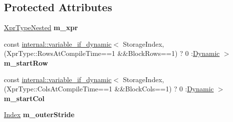 \subsection*{Protected Attributes}
\begin{DoxyCompactItemize}
\item 
\mbox{\label{class_eigen_1_1internal_1_1_block_impl__dense_3_01_xpr_type_00_01_block_rows_00_01_block_cols_00_01_inner_panel_00_01true_01_4_a746d7500a44f0475b2d11ffb0476135b}} 
\hyperlink{class_eigen_1_1internal_1_1_tensor_lazy_evaluator_writable}{Xpr\+Type\+Nested} {\bfseries m\+\_\+xpr}
\item 
\mbox{\label{class_eigen_1_1internal_1_1_block_impl__dense_3_01_xpr_type_00_01_block_rows_00_01_block_cols_00_01_inner_panel_00_01true_01_4_a1de08e356021d7186750589df6f58fca}} 
const \hyperlink{class_eigen_1_1internal_1_1variable__if__dynamic}{internal\+::variable\+\_\+if\+\_\+dynamic}$<$ Storage\+Index,(Xpr\+Type\+::\+Rows\+At\+Compile\+Time==1 \&\&Block\+Rows==1) ? 0 \+:\hyperlink{namespace_eigen_ad81fa7195215a0ce30017dfac309f0b2}{Dynamic} $>$ {\bfseries m\+\_\+start\+Row}
\item 
\mbox{\label{class_eigen_1_1internal_1_1_block_impl__dense_3_01_xpr_type_00_01_block_rows_00_01_block_cols_00_01_inner_panel_00_01true_01_4_af0f6fcd80e1b47cc1cad07a28c07cbdb}} 
const \hyperlink{class_eigen_1_1internal_1_1variable__if__dynamic}{internal\+::variable\+\_\+if\+\_\+dynamic}$<$ Storage\+Index,(Xpr\+Type\+::\+Cols\+At\+Compile\+Time==1 \&\&Block\+Cols==1) ? 0 \+:\hyperlink{namespace_eigen_ad81fa7195215a0ce30017dfac309f0b2}{Dynamic} $>$ {\bfseries m\+\_\+start\+Col}
\item 
\mbox{\label{class_eigen_1_1internal_1_1_block_impl__dense_3_01_xpr_type_00_01_block_rows_00_01_block_cols_00_01_inner_panel_00_01true_01_4_ae0744034189ad873da698feebfe0a374}} 
\hyperlink{namespace_eigen_a62e77e0933482dafde8fe197d9a2cfde}{Index} {\bfseries m\+\_\+outer\+Stride}
\end{DoxyCompactItemize}


